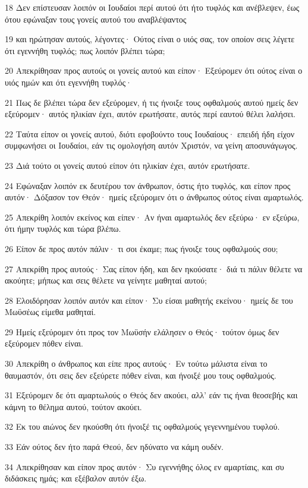 \par 18 Δεν επίστευσαν λοιπόν οι Ιουδαίοι περί αυτού ότι ήτο τυφλός και ανέβλεψεν, έως ότου εφώναξαν τους γονείς αυτού του αναβλέψαντος
\par 19 και ηρώτησαν αυτούς, λέγοντες· Ούτος είναι ο υιός σας, τον οποίον σεις λέγετε ότι εγεννήθη τυφλός; πως λοιπόν βλέπει τώρα;
\par 20 Απεκρίθησαν προς αυτούς οι γονείς αυτού και είπον· Εξεύρομεν ότι ούτος είναι ο υιός ημών και ότι εγεννήθη τυφλός·
\par 21 Πως δε βλέπει τώρα δεν εξεύρομεν, ή τις ήνοιξε τους οφθαλμούς αυτού ημείς δεν εξεύρομεν· αυτός ηλικίαν έχει, αυτόν ερωτήσατε, αυτός περί εαυτού θέλει λαλήσει.
\par 22 Ταύτα είπον οι γονείς αυτού, διότι εφοβούντο τους Ιουδαίους· επειδή ήδη είχον συμφωνήσει οι Ιουδαίοι, εάν τις ομολογήση αυτόν Χριστόν, να γείνη αποσυνάγωγος.
\par 23 Διά τούτο οι γονείς αυτού είπον ότι ηλικίαν έχει, αυτόν ερωτήσατε.
\par 24 Εφώναξαν λοιπόν εκ δευτέρου τον άνθρωπον, όστις ήτο τυφλός, και είπον προς αυτόν· Δόξασον τον Θεόν· ημείς εξεύρομεν ότι ο άνθρωπος ούτος είναι αμαρτωλός.
\par 25 Απεκρίθη λοιπόν εκείνος και είπεν· Αν ήναι αμαρτωλός δεν εξεύρω· εν εξεύρω, ότι ήμην τυφλός και τώρα βλέπω.
\par 26 Είπον δε προς αυτόν πάλιν· τι σοι έκαμε; πως ήνοιξε τους οφθαλμούς σου;
\par 27 Απεκρίθη προς αυτούς· Σας είπον ήδη, και δεν ηκούσατε· διά τι πάλιν θέλετε να ακούητε; μήπως και σεις θέλετε να γείνητε μαθηταί αυτού;
\par 28 Ελοιδόρησαν λοιπόν αυτόν και είπον· Συ είσαι μαθητής εκείνου· ημείς δε του Μωϋσέως είμεθα μαθηταί.
\par 29 Ημείς εξεύρομεν ότι προς τον Μωϋσήν ελάλησεν ο Θεός· τούτον όμως δεν εξεύρομεν πόθεν είναι.
\par 30 Απεκρίθη ο άνθρωπος και είπε προς αυτούς· Εν τούτω μάλιστα είναι το θαυμαστόν, ότι σεις δεν εξεύρετε πόθεν είναι, και ήνοιξέ μου τους οφθαλμούς.
\par 31 Εξεύρομεν δε ότι αμαρτωλούς ο Θεός δεν ακούει, αλλ' εάν τις ήναι θεοσεβής και κάμνη το θέλημα αυτού, τούτον ακούει.
\par 32 Εκ του αιώνος δεν ηκούσθη ότι ήνοιξέ τις οφθαλμούς γεγεννημένου τυφλού.
\par 33 Εάν ούτος δεν ήτο παρά Θεού, δεν ηδύνατο να κάμη ουδέν.
\par 34 Απεκρίθησαν και είπον προς αυτόν· Συ εγεννήθης όλος εν αμαρτίαις, και συ διδάσκεις ημάς; και εξέβαλον αυτόν έξω.
